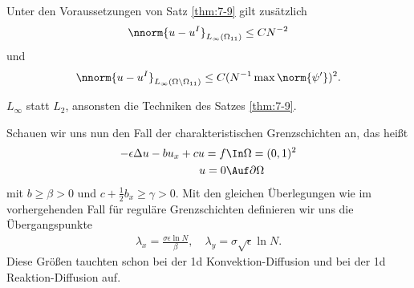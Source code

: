 \begin{lemma}\label{lem:7-10}
  Unter den Voraussetzungen von Satz \ref{thm:7-9} gilt zusätzlich
  \begin{align*}
    \nnorm{u - u^{I}}_{L_{\infty}(\Omega_{11})} \leq C N^{-2}
  \end{align*}
und
\begin{align*}
    \nnorm{u - u^{I}}_{L_{\infty}(\Omega\setminus\Omega_{11})} \leq C (N^{-1} \max\norm{\psi'})^{2}. 
\end{align*}
\end{lemma}
 \begin{beweis}
   $L_{\infty}$ statt $L_{2}$, ansonsten die Techniken des Satzes \ref{thm:7-9}. 
 \end{beweis}

Schauen wir uns nun den Fall der charakteristischen Grenzschichten an, das heißt
\begin{align*}
  - \epsilon \Delta u - b u_{x} + cu = f &\In \Omega = (0, 1)^{2} \\
u = 0& \Auf \partial \Omega 
\end{align*}
mit $b \geq \beta > 0$ und $ c + \frac 12 b_{x} \geq \gamma> 0$. 
Mit den gleichen Überlegungen wie im vorhergehenden Fall für reguläre Grenzschichten definieren wir uns die Übergangspunkte
\begin{align*}
  \lambda_{x} = \frac{\sigma\epsilon \ln N} \beta, \quad   \lambda_{y} = \sigma \sqrt\epsilon \ln N. 
\end{align*}
Diese Größen tauchten schon bei der 1d Konvektion-Diffusion und bei der 1d Reaktion-Diffusion auf. 
